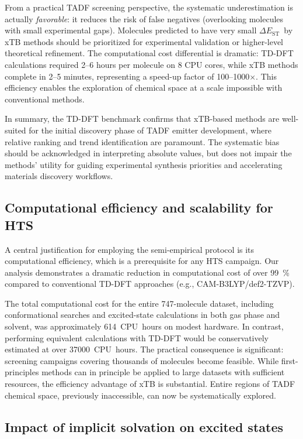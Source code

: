\documentclass[journal=jcisd8,manuscript=article,keywords=true]{achemso}
\newcommand{\deltaest}{$\Delta E_{\text{ST}}$}
\begin{document}
From a practical TADF screening perspective, the systematic underestimation is actually \textit{favorable}: it reduces the risk of false negatives 
(overlooking molecules with small experimental gaps). Molecules predicted to have very small \deltaest\ by xTB methods should be prioritized for experimental 
validation or higher-level theoretical refinement. The computational cost differential is dramatic: TD-DFT calculations required 2--6 hours per molecule on 8 
CPU cores, while xTB methods complete in 2--5 minutes, representing a speed-up factor of 100--1000$\times$. This efficiency enables the exploration of chemical 
space at a scale impossible with conventional methods.

In summary, the TD-DFT benchmark confirms that xTB-based methods are well-suited for the initial discovery phase of TADF emitter development, where relative 
ranking and trend identification are paramount. The systematic bias should be acknowledged in interpreting absolute values, but does not impair the methods' 
utility for guiding experimental synthesis priorities and accelerating materials discovery workflows.

\subsection{Computational efficiency and scalability for HTS}

A central justification for employing the semi-empirical protocol is its computational
efficiency, which is a prerequisite for any HTS campaign. Our analysis demonstrates a
dramatic reduction in computational cost of over \qty{99}{\percent} compared to
conventional TD-DFT approaches (e.g., CAM-B3LYP/def2-TZVP).

The total computational cost for the entire \num{747}-molecule dataset, including
conformational searches and excited-state calculations in both gas phase and solvent, was
approximately \qty{614}{CPU~hours} on modest hardware. In contrast, performing equivalent
calculations with TD-DFT would be conservatively estimated at over \qty{37000}{CPU~hours}.
The practical consequence is significant: screening campaigns covering thousands of
molecules become feasible. While first-principles methods can in principle be applied to large datasets with sufficient resources, the efficiency advantage of 
xTB is substantial. Entire
regions of TADF chemical space, previously inaccessible, can now be systematically
explored.

\subsection{Impact of implicit solvation on excited states}
\end{document}
